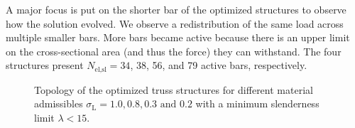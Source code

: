 A major focus is put on the shorter bar of the optimized structures to observe how the solution evolved. We observe a redistribution of the same load across multiple smaller bars. More bars became active because there is an upper limit on the cross-sectional area (and thus the force) they can withstand. The four structures present $N_\text{el,sl}=34$, 38, 56, and 79 active bars, respectively.

\begin{figure}
    \hfill
    \hfill
    \hfill
    \caption{Topology of the optimized truss structures for different material admissibles $\sigma_\text{L}=1.0,0.8,0.3\text{ and }0.2$ with a minimum slenderness limit $\lambda<15$.}
    \label{fig:04_tto_slend}
\end{figure}

